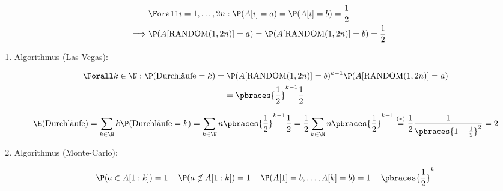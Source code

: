 \begin{solution}

\begin{align*}
    & \Forall i = 1, \dots, 2 n:
    \P(A[i] = a) = \P(A[i] = b) = \frac{1}{2} \\
    \implies
    & \P(A[\text{RANDOM}(1, 2 n)] = a) = \P(A[\text{RANDOM}(1, 2 n)] = b) = \frac{1}{2}
\end{align*}

\begin{enumerate}[label = \arabic*.]

    \item Algorithmus (Las-Vegas):
    
    \begin{multline*}
        \Forall k \in \N:
        \P(\text{Durchläufe} = k)
        =
        \P(A[\text{RANDOM}(1, 2 n)] = b)^{k-1}
        \P(A[\text{RANDOM}(1, 2 n)] = a) \\
        =
        \pbraces{\frac{1}{2}}^{k-1}
        \frac{1}{2}
    \end{multline*}
    
    \begin{align*}
        \E(\text{Durchläufe})
        =
        \sum_{k \in \N}
            k
            \P(\text{Durchläufe} = k)
        =
        \sum_{k \in \N}
            n
            \pbraces{\frac{1}{2}}^{k-1}
            \frac{1}{2}
        =
        \frac{1}{2}
        \sum_{k \in \N}
            n
            \pbraces{\frac{1}{2}}^{k-1}
        \stackrel
        {
            (\ast)
        }{=}
        \frac{1}{2}
        \frac{1}{\pbraces{1 - \frac{1}{2}}^2}
        =
        2
    \end{align*}

    \item Algorithmus (Monte-Carlo):

    \begin{align*}
        \P(a \in A[1:k])
        =
        1 - \P(a \not \in A[1:k])
        =
        1 - \P(A[1] = b, \dots, A[k] = b)
        =
        1 - \pbraces{\frac{1}{2}}^k
    \end{align*}

\end{enumerate}

\end{solution}
